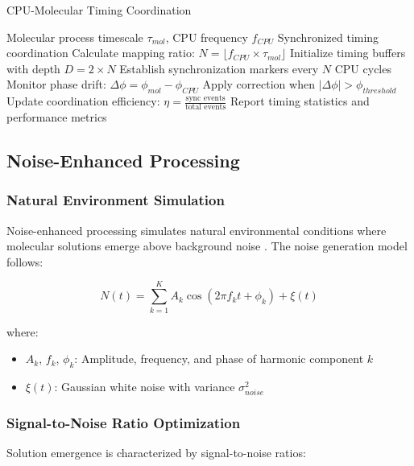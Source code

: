 \documentclass[12pt,a4paper]{article}
\begin{document}
\begin{algorithm}[H]
\caption{CPU-Molecular Timing Coordination}
\begin{algorithmic}[1]
\REQUIRE Molecular process timescale $\tau_{mol}$, CPU frequency $f_{CPU}$
\ENSURE Synchronized timing coordination
\STATE Calculate mapping ratio: $N = \lfloor f_{CPU} \times \tau_{mol} \rfloor$
\STATE Initialize timing buffers with depth $D = 2 \times N$
\STATE Establish synchronization markers every $N$ CPU cycles
\STATE Monitor phase drift: $\Delta\phi = \phi_{mol} - \phi_{CPU}$
\STATE Apply correction when $|\Delta\phi| > \phi_{threshold}$
\STATE Update coordination efficiency: $\eta = \frac{\text{sync events}}{\text{total events}}$
\STATE Report timing statistics and performance metrics
\end{algorithmic}
\end{algorithm}

\subsection{Noise-Enhanced Processing}

\subsubsection{Natural Environment Simulation}

Noise-enhanced processing simulates natural environmental conditions where molecular solutions emerge above background noise \cite{mcdonnell2011benefits}. The noise generation model follows:

\begin{equation}
N(t) = \sum_{k=1}^{K} A_k \cos(2\pi f_k t + \phi_k) + \xi(t)
\end{equation}

where:
\begin{itemize}
\item $A_k$, $f_k$, $\phi_k$: Amplitude, frequency, and phase of harmonic component $k$
\item $\xi(t)$: Gaussian white noise with variance $\sigma^2_{noise}$
\end{itemize}

\subsubsection{Signal-to-Noise Ratio Optimization}

Solution emergence is characterized by signal-to-noise ratios:
\end{document}
